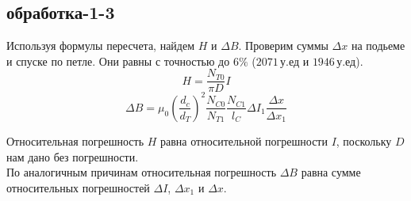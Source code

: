 \documentclass[a4paper]{article}
\begin{document}
\begin{enumerate}
\subsection*{обработка-1-3}
Используя формулы пересчета, найдем $H$ и $\Delta B$.
Проверим суммы $\Delta x$ на подьеме и спуске по петле. Они равны с точностью до $6\%$ ($2071\,\text{у.ед}$ и $1946\,\text{у.ед}$).
$$H=\frac{N_{T0}}{\pi D}I$$
$$\Delta B = \mu_0 \left(\frac{d_c}{d_T}\right)^2\frac{N_{C0}}{N_{T1}}\frac{N_{C1}}{l_C}\Delta I_1 \frac{\Delta x}{\Delta x_1}$$

Относительная погрешность $H$ равна относительной погрешности $I$, поскольку $D$ нам дано без погрешности.\\
По аналогичным причинам относительная погрешность $\Delta B$ равна сумме относительных погрешностей $\Delta I$, $\Delta x_1$ и $\Delta x$.

\newpage


\end{enumerate}
\end{document}
